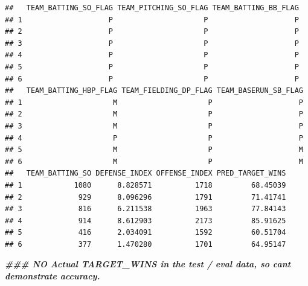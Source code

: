\documentclass[
]{article}
\newenvironment{Shaded}{\begin{snugshade}}{\end{snugshade}}
\newcommand{\DocumentationTok}[1]{\textcolor[rgb]{0.56,0.35,0.01}{\textbf{\textit{#1}}}}
\begin{document}
\begin{verbatim}
##   TEAM_BATTING_SO_FLAG TEAM_PITCHING_SO_FLAG TEAM_BATTING_BB_FLAG
## 1                    P                     P                    P
## 2                    P                     P                    P
## 3                    P                     P                    P
## 4                    P                     P                    P
## 5                    P                     P                    P
## 6                    P                     P                    P
##   TEAM_BATTING_HBP_FLAG TEAM_FIELDING_DP_FLAG TEAM_BASERUN_SB_FLAG
## 1                     M                     P                    P
## 2                     M                     P                    P
## 3                     M                     P                    P
## 4                     P                     P                    P
## 5                     M                     P                    M
## 6                     M                     P                    M
##   TEAM_BATTING_SO DEFENSE_INDEX OFFENSE_INDEX PRED_TARGET_WINS
## 1            1080      8.828571          1718         68.45039
## 2             929      8.096296          1791         71.41741
## 3             816      6.211538          1963         77.84143
## 4             914      8.612903          2173         85.91625
## 5             416      2.034091          1592         60.51704
## 6             377      1.470280          1701         64.95147
\end{verbatim}

\begin{Shaded}
\begin{Highlighting}[]
\DocumentationTok{\#\#\# NO Actual TARGET\_WINS in the test / eval data, so cant demonstrate accuracy. }
\end{Highlighting}
\end{Shaded}
\end{document}
